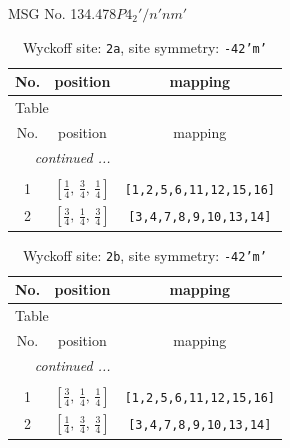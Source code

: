 \documentclass[fleqn,8pt]{jsarticle}
\begin{document}
\setcounter{MaxMatrixCols}{32}

\renewcommand{\tablename}{Table~}
\renewcommand{\figurename}{Figure~}
\begin{center}
\LARGE
MSG No. 134.478\quad$P4_{2}'/n'nm'$
\end{center}
\renewcommand{\arraystretch}{1.2}
\begin{longtable}{ccc}
\caption{Wyckoff site: {\tt 2a}, site symmetry: {\tt -42'm'}}
 \\
 \hline \hline
No. & position & mapping \\ \hline \endfirsthead

\multicolumn{2}{l}{\tablename\ \thetable{}} \\
 \hline \hline
No. & position & mapping \\ \hline \endhead

 \hline \hline
\multicolumn{2}{r}{\footnotesize\it continued ...} \\ \endfoot

 \hline \hline
\multicolumn{2}{r}{} \\ \endlastfoot

1 & $\left[ \frac{1}{4},\, \frac{3}{4},\, \frac{1}{4} \right]$ & {\tt [1,2,5,6,11,12,15,16]} \\ \hline
2 & $\left[ \frac{3}{4},\, \frac{1}{4},\, \frac{3}{4} \right]$ & {\tt [3,4,7,8,9,10,13,14]} \\
\end{longtable}
\renewcommand{\arraystretch}{1.2}
\begin{longtable}{ccc}
\caption{Wyckoff site: {\tt 2b}, site symmetry: {\tt -42'm'}}
 \\
 \hline \hline
No. & position & mapping \\ \hline \endfirsthead

\multicolumn{2}{l}{\tablename\ \thetable{}} \\
 \hline \hline
No. & position & mapping \\ \hline \endhead

 \hline \hline
\multicolumn{2}{r}{\footnotesize\it continued ...} \\ \endfoot

 \hline \hline
\multicolumn{2}{r}{} \\ \endlastfoot

1 & $\left[ \frac{3}{4},\, \frac{1}{4},\, \frac{1}{4} \right]$ & {\tt [1,2,5,6,11,12,15,16]} \\ \hline
2 & $\left[ \frac{1}{4},\, \frac{3}{4},\, \frac{3}{4} \right]$ & {\tt [3,4,7,8,9,10,13,14]} \\
\end{longtable}
\end{document}
